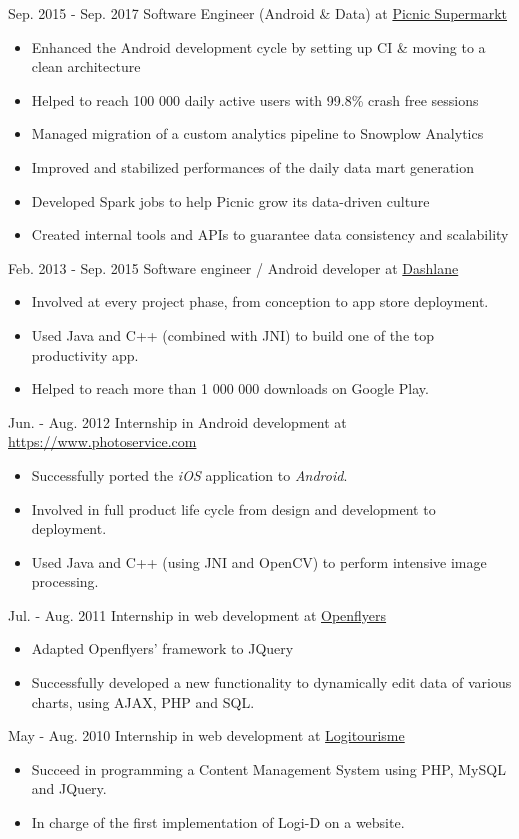 \cventry
{Sep. 2015 - Sep. 2017}
{Software Engineer (Android \& Data)}
{at \href{https://www.picnic.nl}{Picnic Supermarkt}}
{}
{}
{
	\begin{itemize}
		\item Enhanced the Android development cycle by setting up CI \& moving to a clean architecture
		\item Helped to reach 100 000 daily active users with 99.8\% crash free sessions
		\item Managed migration of a custom analytics pipeline to Snowplow Analytics
		\item Improved and stabilized performances of the daily data mart generation
		\item Developed Spark jobs to help Picnic grow its data-driven culture
		\item Created internal tools and APIs to guarantee data consistency and scalability
	\end{itemize}
}

\cventry
{Feb. 2013 - Sep. 2015}
{Software engineer / Android developer}
{at \href{https://www.dashlane.com}{Dashlane}}
{}
{}
{
	\begin{itemize}
		\item Involved at every project phase, from conception to app store deployment.
		\item Used Java and C++ (combined with JNI) to build one of the top productivity app.
		\item Helped to reach more than 1 000 000 downloads on Google Play.
	\end{itemize}
}

\cventry
{Jun. - Aug. 2012}
{Internship in Android development}
{at \href{CGIN}{https://www.photoservice.com}}
{}
{}
{
	\begin{itemize}
		\item Successfully ported the \textit{iOS} application to \textit{Android}.
		\item Involved in full product life cycle from design and development to deployment.
		\item Used Java and C++ (using JNI and OpenCV) to perform intensive image processing.
	\end{itemize}
}

\cventry
{Jul. - Aug. 2011}
{Internship in web development}
{at \href{https://openflyers.com/}{Openflyers}}
{}
{}
{
	\begin{itemize}
		\item Adapted Openflyers' framework to JQuery
		\item Successfully developed a new functionality to dynamically edit data of various charts, using AJAX, PHP and SQL.
	\end{itemize}
}

\cventry
{May - Aug. 2010}
{Internship in web development}
{at \href{https://www.logitourisme.com/}{Logitourisme}}
{}
{}
{
	\begin{itemize}
		\item Succeed in programming a Content Management System using PHP, MySQL and JQuery.
		\item In charge of the first implementation of Logi-D on a website. 
	\end{itemize}
}